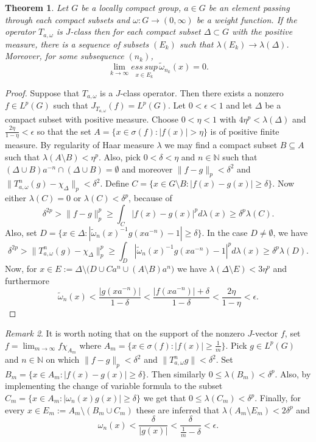 \documentclass{amsart}
\newtheorem{thm}{Theorem}[section]
\theoremstyle{definition}\newtheorem{defn}[thm]{Definition}
\theoremstyle{remark}
\newtheorem{rem}[thm]{Remark}
\numberwithin{equation}{section}
\begin{document}
\begin{thm}\label{t2.2}
Let $G$ be a locally compact group, $a\in G$ be an element passing
through  each compact subsets and $\omega:G\to (0,\infty)$ be a
weight function. If the operator $T_{a,\omega}$   is $J$-class then
for each compact subset $\Delta \subset G$ with the positive
measure, there is a sequence of subsets $(E_k)$ such that
$\lambda(E_k)\to\lambda(\Delta)$. Moreover, for some subsequence
$(n_k)$,
$$
\lim_{k\rightarrow \infty}\underset{x\in E_{k}}{ess\,sup}\,
 \tilde{\omega}_{n_k}(x)=0.
$$
\end{thm}
\begin{proof}
Suppose that $T_{a,\omega}$ is a  $J$-class operator. Then there
exists a nonzero $f \in L^p(G)$ such that
$J_{T_{a,\omega}}(f)=L^p(G)$. Let $0<\epsilon<1$ and let $\Delta$ be
a compact subset with positive measure. Choose $0<\eta<1$ with
$4\eta^p<\lambda(\Delta)$ and $\frac{2\eta}{1-\eta}<\epsilon$ so
that the set $A=\{x\in\sigma(f):|f(x)|>\eta\}$ is of positive finite
measure. By regularity of Haar measure $\lambda$ we may find a
compact subset $B\subseteq A$ such that $\lambda(A\setminus
B)<\eta^p$. Also, pick $0<\delta<\eta$ and $n\in\mathbb{N}$ such
that $(\Delta\cup B)a^{-n}\cap(\Delta\cup B)=\emptyset$ and moreover
$\|f-g\|_p<\delta^2$ and
$\|T_{a,\omega}^n(g)-\chi_{\Delta}\|_p<\delta^2$. Define $C=\{x\in
G\setminus B: |f(x)-g(x)|\geq\delta\}$. Now either $\lambda(C)=0$ or
$\lambda(C)<\delta^p$, because of
$$
\delta^{2p}>\|f-g\|_{p}^p\geq\int_C|f(x)-g(x)|^p
d\lambda(x)\geq\delta^p\lambda(C).
$$
Also, set
$D=\{x\in\Delta:|\tilde{\omega}_n(x)^{-1}g(xa^{-n})-1|\geq\delta\}$.
In the case $D\neq \emptyset$, we have
$$
\delta^{2p}>\|T_{a,\omega}^n(g)-\chi_{\Delta}\|_{p}^p\geq\int_D|\tilde{\omega}_n(x)^{-1}g(xa^{-n})-1|^p
d\lambda(x)\geq\delta^p\lambda(D).
$$
Now, for $x\in E:=\Delta\setminus \big(D\cup Ca^n\cup(A\setminus
B)a^n\big)$ we have $\lambda(\Delta\setminus E)<3\eta^p$ and
furthermore
$$
\tilde{\omega}_n(x)<\frac{|g(xa^{-n})|}{1-\delta}
<\frac{|f(xa^{-n})|+\delta}{1-\delta}<\frac{2\eta}{1-\eta}<\epsilon.
$$
\end{proof}
\begin{rem}
It is worth noting that on the support of the nonzero $J$-vector
$f$, set $f=\lim_{m\to\infty}f\chi_{A_m}$ where $A_m=\{x\in
\sigma(f): |f(x)|\geq\frac{1}{m}\}$. Pick $g\in L^p(G)$ and
$n\in\mathbb{N}$ on which $\|f-g\|_p<\delta^2$ and
$\|T_{a,\omega}^{n}g\|<\delta^2$. Set $B_m=\{x\in A_m:
|f(x)-g(x)|\geq\delta\}$. Then similarly
$0\leq\lambda(B_m)<\delta^p$. Also, by implementing the change of
variable formula to the subset   $C_m=\{x\in A_m:
|\omega_n(x)g(x)|\geq\delta\}$ we get that
$0\leq\lambda(C_m)<\delta^p$. Finally, for every $x\in E_m:=
A_m\setminus(B_m\cup C_m)$ these are inferred that
$\lambda(A_m\setminus E_m)<2\delta^p$ and
$$
\omega_n(x)<\frac{\delta}{|g(x)|}
<\frac{\delta}{\frac{1}{m}-\delta}<\epsilon.
$$
\end{rem}
\end{document}

